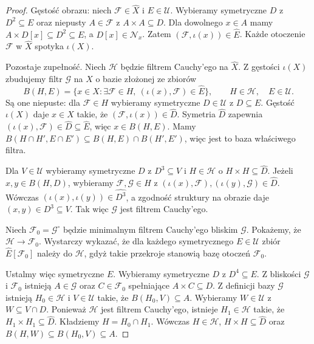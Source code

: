 \begin{proof}
Gęstość obrazu: niech
$\mathcal F\in\widehat X$ i $E\in\mathcal U$.
Wybieramy symetryczne $D$ z $D^2\subseteq E$
oraz niepusty $A\in\mathcal F$
z $A\times A\subseteq D$.
Dla dowolnego $x\in A$ mamy
$A\times D[x]\subseteq D^2\subseteq E$,
a $D[x]\in\mathcal N_x$.
Zatem $(\mathcal F,\iota(x))\in\widehat E$.
Każde otoczenie $\mathcal F$ w $\widehat X$
spotyka $\iota(X)$.

Pozostaje zupełność. Niech $\mathcal H$
będzie filtrem Cauchy'ego na $\widehat X$.
Z gęstości $\iota(X)$ zbudujemy filtr
$\mathcal G$ na $X$ o bazie złożonej ze zbiorów
\[
 B(H,E)=\{x\in X:\exists \mathcal F\in H,\
       (\iota(x),\mathcal F)\in\widehat E\},
 \qquad H\in\mathcal H,\quad E\in\mathcal U.
\]
Są one niepuste: dla $\mathcal F\in H$
wybieramy symetryczne $D\in\mathcal U$
z $D\subseteq E$. Gęstość $\iota(X)$
daje $x\in X$ takie, że
$(\mathcal F,\iota(x))\in\widehat D$.
Symetria $\widehat D$ zapewnia
$(\iota(x),\mathcal F)\in\widehat D
\subseteq\widehat E$, więc $x\in B(H,E)$.
Mamy
$B(H\cap H',E\cap E')\subseteq
 B(H,E)\cap B(H',E')$,
więc jest to baza właściwego filtra.

Dla $V\in\mathcal U$ wybieramy symetryczne
$D$ z $D^3\subseteq V$ i
$H\in\mathcal H$ o $H\times H\subseteq\widehat D$.
Jeżeli $x,y\in B(H,D)$, wybieramy
$\mathcal F,\mathcal G\in H$ z
$(\iota(x),\mathcal F),(\iota(y),\mathcal G)
\in\widehat D$.
Wówczas
$(\iota(x),\iota(y))\in\widehat{D^3}$,
a zgodność struktury na obrazie daje
$(x,y)\in D^3\subseteq V$.
Tak więc $\mathcal G$ jest filtrem Cauchy'ego.

Niech $\mathcal F_0=\mathcal G^\circ$
będzie minimalnym filtrem Cauchy'ego bliskim
$\mathcal G$. Pokażemy, że
$\mathcal H\to\mathcal F_0$.
Wystarczy wykazać, że dla każdego
symetrycznego $E\in\mathcal U$
zbiór $\widehat E[\mathcal F_0]$
należy do $\mathcal H$, gdyż
takie przekroje stanowią bazę otoczeń
$\mathcal F_0$.

Ustalmy więc symetryczne $E$.
Wybieramy symetryczne $D$ z
$D^4\subseteq E$.
Z bliskości $\mathcal G$ i
$\mathcal F_0$ istnieją
$A\in\mathcal G$ oraz
$C\in\mathcal F_0$ spełniające
$A\times C\subseteq D$.
Z definicji bazy $\mathcal G$
istnieją $H_0\in\mathcal H$
i $V\in\mathcal U$ takie, że
$B(H_0,V)\subseteq A$.
Wybieramy $W\in\mathcal U$
z $W\subseteq V\cap D$.
Ponieważ $\mathcal H$ jest
filtrem Cauchy'ego, istnieje
$H_1\in\mathcal H$ takie, że
$H_1\times H_1\subseteq\widehat D$.
Kładziemy $H=H_0\cap H_1$.
Wówczas $H\in\mathcal H$,
$H\times H\subseteq\widehat D$ oraz
$B(H,W)\subseteq B(H_0,V)\subseteq A$.


\end{proof}
